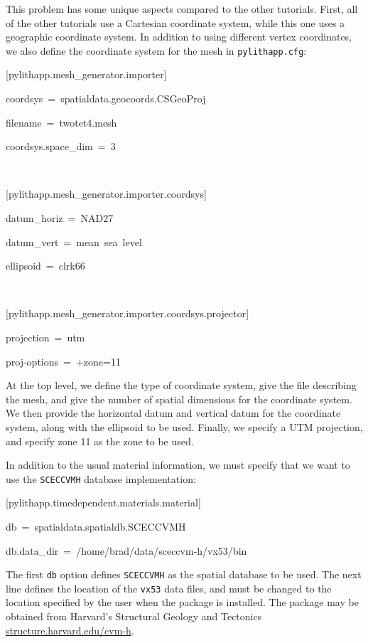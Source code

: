 This problem has some unique aspects compared to the other tutorials.
First, all of the other tutorials use a Cartesian coordinate system,
while this one uses a geographic coordinate system. In addition to
using different vertex coordinates, we also define the coordinate
system for the mesh in \texttt{pylithapp.cfg}:
\begin{lyxcode}
{[}pylithapp.mesh\_generator.importer{]}

coordsys~=~spatialdata.geocoords.CSGeoProj

filename~=~twotet4.mesh

coordsys.space\_dim~=~3

~

{[}pylithapp.mesh\_generator.importer.coordsys{]}

datum\_horiz~=~NAD27

datum\_vert~=~mean~sea~level

ellipsoid~=~clrk66

~

{[}pylithapp.mesh\_generator.importer.coordsys.projector{]}

projection~=~utm

proj-options~=~+zone=11~
\end{lyxcode}
At the top level, we define the type of coordinate system, give the
file describing the mesh, and give the number of spatial dimensions
for the coordinate system. We then provide the horizontal datum and
vertical datum for the coordinate system, along with the ellipsoid
to be used. Finally, we specify a UTM projection, and specify zone
11 as the zone to be used.

In addition to the usual material information, we must specify that
we want to use the \texttt{SCECCVMH} database implementation:
\begin{lyxcode}
{[}pylithapp.timedependent.materials.material{]}

db~=~spatialdata.spatialdb.SCECCVMH

db.data\_dir~=~/home/brad/data/sceccvm-h/vx53/bin
\end{lyxcode}
The first \texttt{db} option defines \texttt{SCECCVMH} as the spatial
database to be used. The next line defines the location of the \texttt{vx53}
data files, and must be changed to the location specified by the user
when the package is installed. The package may be obtained from Harvard's
Structural Geology and Tectonics \url{structure.harvard.edu/cvm-h}.

